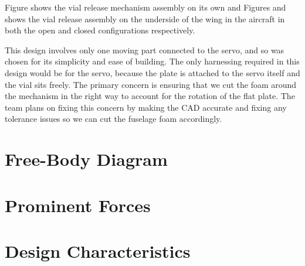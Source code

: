         Figure   shows the vial release mechanism assembly on its own and Figures   and     shows the vial release assembly on the underside of the wing in the aircraft in both the open and closed configurations respectively.
        
        This design involves only one moving part connected to the servo, and so was chosen for its simplicity and ease of building. The only harnessing required in this design would be for the servo, because the plate is attached to the servo itself and the vial sits freely. The primary concern is ensuring that we cut the foam around the mechanism in the right way to account for the rotation of the flat plate. The team plans on fixing this concern by making the CAD accurate and fixing any tolerance issues so we can cut the fuselage foam accordingly.
    

\section{Free-Body Diagram}

\section{Prominent Forces}

\section{Design Characteristics}

